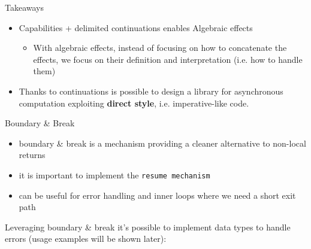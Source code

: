 \documentclass[aspectratio=169,xcolor=dvipsnames]{beamer}
\begin{document}

\begin{frame}
       
\end{frame}


\begin{frame}
    \begin{block}{Takeaways}
        \begin{itemize}
            \item Capabilities + delimited continuations enables Algebraic effects
            \begin{itemize}
                \item With algebraic effects, instead of focusing on how to concatenate the effects, we focus on their definition and interpretation (i.e. how to handle them)
            \end{itemize}
            \item Thanks to continuations is possible to design a library for asynchronous computation exploiting \textbf{direct style}, i.e. imperative-like code.
        \end{itemize}
    \end{block}
\end{frame}


\begin{frame}{Boundary \& Break \cite{scalar-gears}}
    \begin{itemize}
        \item boundary \& break is a mechanism providing a cleaner alternative to non-local returns
        
        \item it is important to implement the \texttt{resume mechanism}
        \item can be useful for error handling and inner loops where we need a short exit path
    \end{itemize}
\end{frame}


\begin{frame}
    Leveraging boundary \& break it's possible to implement data types to handle errors (usage examples will be shown later):
       
\end{frame}
\end{document}
